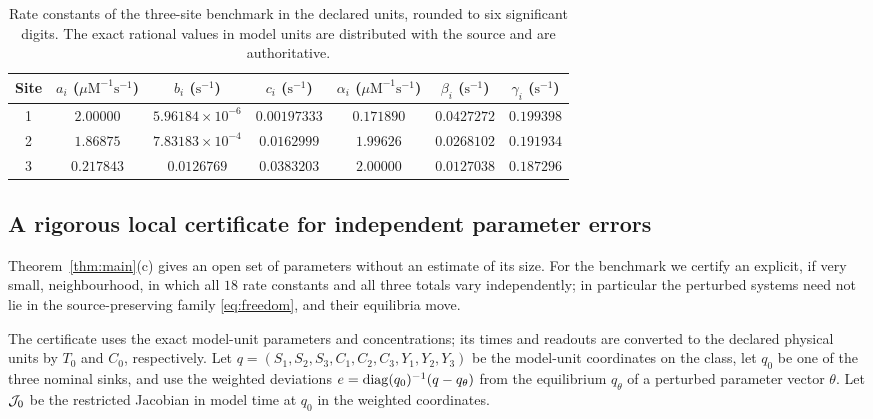\begin{table}[ht]
\centering
\caption{Rate constants of the three-site benchmark in the declared units, rounded to six
significant digits. The exact rational values in model units are distributed with the
source and are authoritative.}\label{tab:rates}
\begin{tabular}{ccccccc}
\toprule
Site & \(a_i\) (\(\mu\mathrm M^{-1}\mathrm s^{-1}\)) & \(b_i\) (\(\mathrm s^{-1}\)) &
\(c_i\) (\(\mathrm s^{-1}\)) & \(\alpha_i\) (\(\mu\mathrm M^{-1}\mathrm s^{-1}\)) &
\(\beta_i\) (\(\mathrm s^{-1}\)) & \(\gamma_i\) (\(\mathrm s^{-1}\))\\
\midrule
1 & \(2.00000\) & \(5.96184\times10^{-6}\) & \(0.00197333\) & \(0.171890\) & \(0.0427272\) & \(0.199398\)\\
2 & \(1.86875\) & \(7.83183\times10^{-4}\) & \(0.0162999\) & \(1.99626\) & \(0.0268102\) & \(0.191934\)\\
3 & \(0.217843\) & \(0.0126769\) & \(0.0383203\) & \(2.00000\) & \(0.0127038\) & \(0.187296\)\\
\bottomrule
\end{tabular}
\end{table}

\subsection{A rigorous local certificate for independent parameter errors}
Theorem~\ref{thm:main}(c) gives an open set of parameters without an estimate of its size. For
the benchmark we certify an explicit, if very small, neighbourhood, in which all \(18\) rate
constants and all three totals vary independently; in particular the perturbed systems need
not lie in the source-preserving family \eqref{eq:freedom}, and their equilibria move.

The certificate uses the exact model-unit parameters and concentrations; its times and
readouts are converted to the declared physical units by \(T_0\) and \(C_0\), respectively.
Let \(q=(S_1,S_2,S_3,C_1,C_2,C_3,Y_1,Y_2,Y_3)\) be the model-unit coordinates on the class, let \(q_0\) be
one of the three nominal sinks, and use the weighted deviations
\(e=\operatorname{diag}(q_0)^{-1}(q-q_\theta)\) from the equilibrium \(q_\theta\) of a perturbed parameter
vector \(\theta\). Let \(\mathcal J_0\) be the restricted Jacobian in model time at \(q_0\) in the weighted
coordinates.

